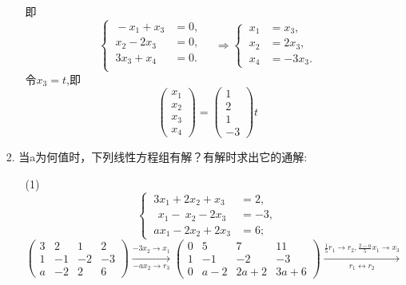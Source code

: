 \documentclass{article}
\begin{document}
\begin{enumerate}
\begin{enumerate}
            即
            \[
                \begin{cases}
                    \ -x_1+x_3&=0,\\
                    \ x_2-2x_3&=0,\\
                    \ 3x_3+x_4&=0.\\
                \end{cases}
                \quad \Rightarrow
                \begin{cases}
                    \ x_1&=x_3,\\
                    \ x_2&=2x_3,\\
                    \ x_4&=-3x_3.
                \end{cases}
            \]
            令$x_3=t$,即
            \[
                \left(\begin{array}{ccc}
                        x_1\\
                        x_2\\
                        x_3\\
                        x_4
                    \end{array}\right)
                =
                \left(\begin{array}{ccc}
                        1\\
                        2\\
                        1\\
                        -3
                    \end{array}\right)
                t
            \]
        \end{enumerate}
        \item [2.]当a为何值时，下列线性方程组有解？有解时求出它的通解:
        \begin{enumerate}
            \item [(1)]
            \[
                \begin{cases}
                    \ 3x_1+2x_2+x_3&=2,\\
                    \ \ \,x_1-\ x_2-2x_3&=-3,\\
                    \ ax_1-2x_2+2x_3&=6;
                \end{cases}
            \]
            $
            \begin{pmatrix}
                3& 2& 1& 2\\
                1& -1& -2& -3\\
                a& -2& 2& 6
            \end{pmatrix}
            \xrightarrow[-ax_2 \rightarrow r_3]{-3x_2 \rightarrow x_1}
            \begin{pmatrix}
                0& 5& 7& 11\\
                1& -1& -2& -3\\
                0& a-2& 2a+2& 3a+6
            \end{pmatrix}
            \xrightarrow[r_1 \leftrightarrow r_2]{\frac{1}{5}r_1 \rightarrow r_2,\frac{2-a}{5}x_1 \rightarrow x_3}
            $


\end{enumerate}
\end{enumerate}
\end{document}

